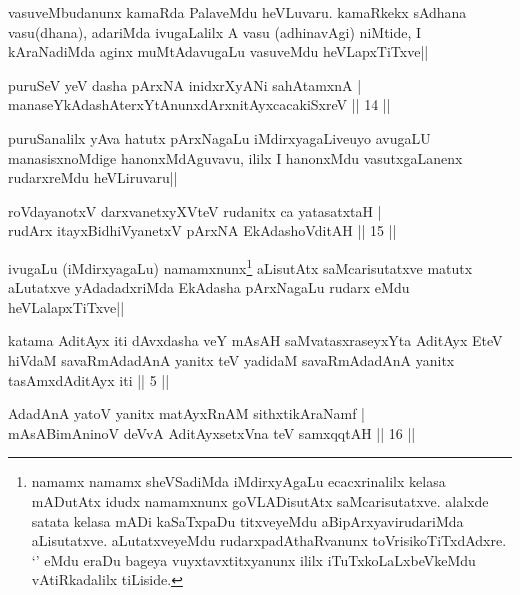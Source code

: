 \begin{artha}
vasuveMbudanunx kamaRda PalaveMdu heVLuvaru. kamaRkekx sAdhana vasu(dhana), adariMda ivugaLalilx A vasu (adhinavAgi) niMtide, I kAraNadiMda aginx muMtAdavugaLu vasuveMdu heVLapxTiTxve||
\end{artha}


\begin{shl}
puruSeV yeV dasha pArxNA inidxrXyANi sahA\s \s tamxnA |\\
manaseYkAdashAterxYtAnunxdArxnitAyxcacakiSxreV \hfill || 14 ||
\end{shl}

\begin{artha}
puruSanalilx yAva hatutx pArxNagaLu iMdirxyagaLiveuyo avugaLU manasisxnoMdige hanonxMdAguvavu, ililx I hanonxMdu vasutxgaLanenx rudarxreMdu heVLiruvaru||
\end{artha}


\begin{shl}
roVdayanotxV darxvanetxyXVteV rudanitx ca yatasatxtaH |\\
rudArx itayxBidhiVyanetxV pArxNA EkAdashoVditAH \hfill || 15 ||
\end{shl}

\begin{artha}
ivugaLu (iMdirxyagaLu) namamxnunx\footnote[1]{namamx namamx sheVSadiMda iMdirxyAgaLu ecacxrinalilx kelasa mADutAtx idudx namamxnunx goVLADisutAtx saMcarisutatxve. alalxde satata kelasa mADi kaSaTxpaDu titxveyeMdu aBipArxyavirudariMda aLisutatxve. aLutatxveyeMdu rudarxpadAthaRvanunx toVrisikoTiTxdAdxre. `\stext ' eMdu eraDu bageya vuyxtavxtitxyanunx ililx iTuTxkoLaLxbeVkeMdu vAtiRkadalilx tiLiside.} aLisutAtx saMcarisutatxve matutx aLutatxve yAdadadxriMda EkAdasha pArxNagaLu rudarx eMdu heVLalapxTiTxve||
\end{artha}


\begin{shl}
katama AditAyx iti dAvxdasha veY mAsAH saMvatasxraseyxYta AditAyx EteV hiVdaM savaRmAdadAnA yanitx teV yadidaM savaRmAdadAnA yanitx tasAmxdAditAyx iti || 5 ||
\end{shl}

\begin{shl}
AdadAnA yatoV yanitx matAyxRnAM sithxtikAraNamf |\\
mAsABimAninoV deVvA AditAyxsetxVna teV samxqqtAH \hfill || 16 ||
\end{shl}

